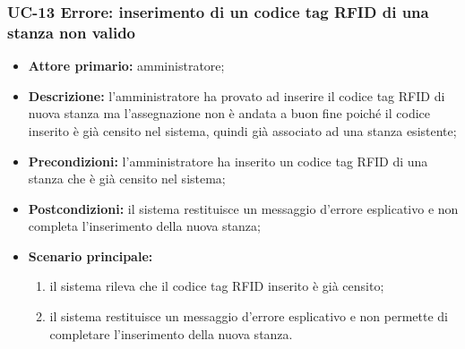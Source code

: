 \subsubsection{UC-13 Errore: inserimento di un codice tag RFID di una stanza non valido}
\begin{itemize}
	\item \textbf{Attore primario:} amministratore;
	\item \textbf{Descrizione:} l'amministratore ha provato ad inserire il codice tag RFID di nuova stanza ma l'assegnazione non è andata a buon fine poiché il codice inserito è già censito nel sistema, quindi già associato ad una stanza esistente;
	\item \textbf{Precondizioni:} l'amministratore ha inserito un codice tag RFID di una stanza che è già censito nel sistema;
	\item \textbf{Postcondizioni:} il sistema restituisce un messaggio d'errore esplicativo e non completa l'inserimento della nuova stanza;
	\item \textbf{Scenario principale:}
	      \begin{enumerate}
		      \item il sistema rileva che il codice tag RFID inserito è già censito; 
		      \item il sistema restituisce un messaggio d'errore esplicativo e non permette di completare l'inserimento della nuova stanza.
	      \end{enumerate}
\end{itemize}

